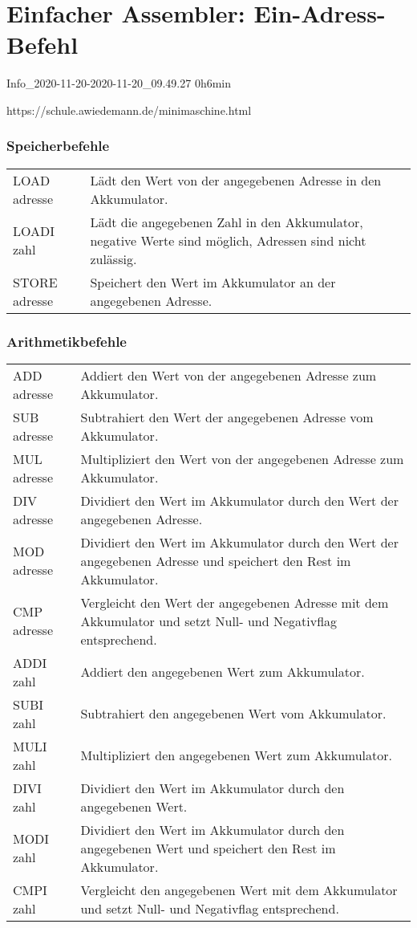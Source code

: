 \documentclass{lehramt-informatik-haupt}
\begin{document}

\chapter{Einfacher Assembler: Ein-Adress-Befehl}

Info\_2020-11-20-2020-11-20\_09.49.27 0h6min

https://schule.awiedemann.de/minimaschine.html

\subsection{Speicherbefehle}

\begin{tabularx}{\linewidth}{lX}
LOAD adresse & Lädt den Wert von der angegebenen Adresse in den Akkumulator. \\
LOADI zahl & Lädt die angegebenen Zahl in den Akkumulator, negative Werte sind möglich, Adressen sind nicht zulässig. \\
STORE adresse & Speichert den Wert im Akkumulator an der angegebenen Adresse.
\end{tabularx}

%

\subsection{Arithmetikbefehle}

\begin{tabularx}{\linewidth}{lX}
ADD adresse & Addiert den Wert von der angegebenen Adresse zum Akkumulator. \\
SUB adresse & Subtrahiert den Wert der angegebenen Adresse vom Akkumulator. \\
MUL adresse & Multipliziert den Wert von der angegebenen Adresse zum Akkumulator. \\
DIV adresse & Dividiert den Wert im Akkumulator durch den Wert der angegebenen Adresse. \\
MOD adresse & Dividiert den Wert im Akkumulator durch den Wert der angegebenen Adresse und speichert den Rest im Akkumulator. \\
CMP adresse & Vergleicht den Wert der angegebenen Adresse mit dem Akkumulator und setzt Null- und Negativflag entsprechend. \\
ADDI zahl & Addiert den angegebenen Wert zum Akkumulator. \\
SUBI zahl & Subtrahiert den angegebenen Wert vom Akkumulator. \\
MULI zahl & Multipliziert den angegebenen Wert zum Akkumulator. \\
DIVI zahl & Dividiert den Wert im Akkumulator durch den angegebenen Wert. \\
MODI zahl & Dividiert den Wert im Akkumulator durch den angegebenen Wert und speichert den Rest im Akkumulator. \\
CMPI zahl & Vergleicht den angegebenen Wert mit dem Akkumulator und setzt Null- und Negativflag entsprechend.
\end{tabularx}
\end{document}
